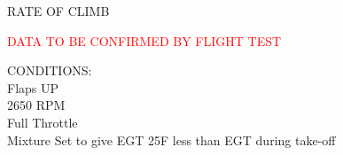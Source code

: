 \begin{figure}[t]
\begin{center}
\begin{perfhdr}RATE OF CLIMB
\end{perfhdr}
\Large
\textcolor{red}{DATA TO BE CONFIRMED BY FLIGHT TEST}\normalsize \\
\vspace{5ex}
\begin{minipage}{4in}
  \begin{flushleft}
    CONDITIONS:\\
    Flaps UP\\
    2650 RPM\\
    Full Throttle\\
    Mixture Set to give EGT 25\textdegree F less than EGT during take-off\\
    \end{flushleft}
  \end{minipage}
\hfill
\\
\vspace{\perfnoteskip}

\settowidth{\colOne}{WEIGHT}
\settowidth{\colTwo}{PRESSURE}
\settowidth{\colThree}{CLIMB}
\settowidth{\colFour}{-20\textdegree C}
\settowidth{\colFive}{9,999}
\settowidth{\colSix}{9,999}
\settowidth{\colSeven}{9,999}


\end{center}
\end{figure}
